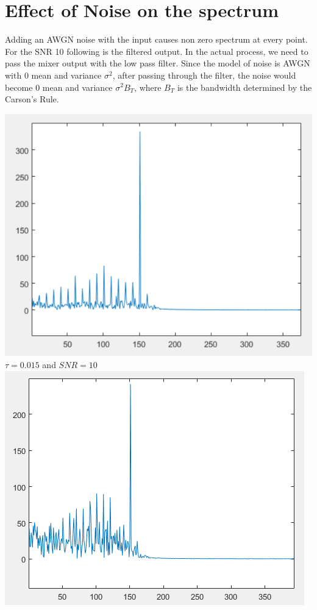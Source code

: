\documentclass[12pt]{article}
\begin{document}
\section*{Effect of Noise on the spectrum}
Adding an AWGN noise with the input causes non zero spectrum at every point. For the SNR 10 following is the filtered output. In the actual process, we need to pass the mixer output with the low pass filter. Since the model of noise is AWGN with 0 mean and variance $\sigma^2$, after passing through the filter, the noise would become 0 mean and variance $\sigma^2B_T $, where $B_T$ is the bandwidth determined by the Carson's Rule.
\begin{center}
     \includegraphics[scale = 0.75]{n1.PNG}\\[1.0 cm]
     $\tau= 0.015$ and $SNR=10$\\
     \includegraphics[scale = 0.75]{n+.PNG}\\[1.0 cm]

\end{center}
\end{document}
